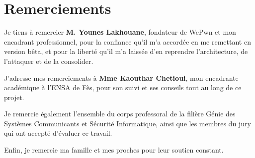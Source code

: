 \chapter*{Remerciements}

Je tiens à remercier \textbf{M. Younes Lakhouane}, fondateur de WePwn et mon encadrant
professionnel, pour la confiance qu'il m'a accordée en me remettant \demo{} en version
bêta, et pour la liberté qu'il m'a laissée d'en reprendre l'architecture, de l'attaquer
et de la consolider.

J'adresse mes remerciements à \textbf{Mme Kaouthar Chetioui}, mon encadrante académique à
l'ENSA de Fès, pour son suivi et ses conseils tout au long de ce projet.

Je remercie également l'ensemble du corps professoral de la filière Génie des Systèmes
Communicants et Sécurité Informatique, ainsi que les membres du jury qui ont accepté
d'évaluer ce travail.

Enfin, je remercie ma famille et mes proches pour leur soutien constant.
